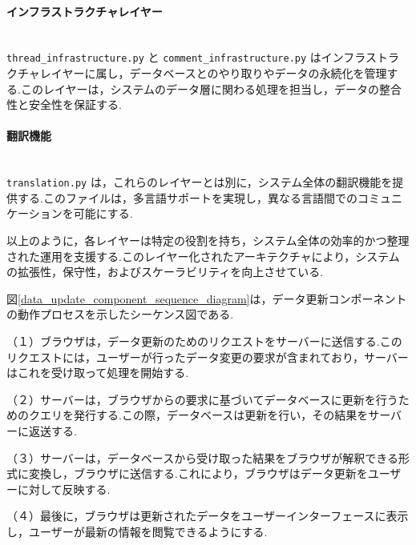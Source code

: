 \documentclass[b5paper,12pt,dvipdfmx]{jsreport}
\begin{document}
\paragraph{インフラストラクチャレイヤー}\mbox{}\\
\texttt{thread\_infrastructure.py} と \texttt{comment\_infrastructure.py} はインフラストラクチャレイヤーに属し，データベースとのやり取りやデータの永続化を管理する.このレイヤーは，システムのデータ層に関わる処理を担当し，データの整合性と安全性を保証する.

\paragraph{翻訳機能}\mbox{}\\
\texttt{translation.py} は，これらのレイヤーとは別に，システム全体の翻訳機能を提供する.このファイルは，多言語サポートを実現し，異なる言語間でのコミュニケーションを可能にする.

以上のように，各レイヤーは特定の役割を持ち，システム全体の効率的かつ整理された運用を支援する.このレイヤー化されたアーキテクチャにより，システムの拡張性，保守性，およびスケーラビリティを向上させている.


図\ref{data_update_component_sequence_diagram}は，データ更新コンポーネントの動作プロセスを示したシーケンス図である.

（１）ブラウザは，データ更新のためのリクエストをサーバーに送信する.このリクエストには，ユーザーが行ったデータ変更の要求が含まれており，サーバーはこれを受け取って処理を開始する.

（２）サーバーは，ブラウザからの要求に基づいてデータベースに更新を行うためのクエリを発行する.この際，データベースは更新を行い，その結果をサーバーに返送する.

（３）サーバーは，データベースから受け取った結果をブラウザが解釈できる形式に変換し，ブラウザに送信する.これにより，ブラウザはデータ更新をユーザーに対して反映する.

（４）最後に，ブラウザは更新されたデータをユーザーインターフェースに表示し，ユーザーが最新の情報を閲覧できるようにする.

\end{document}
